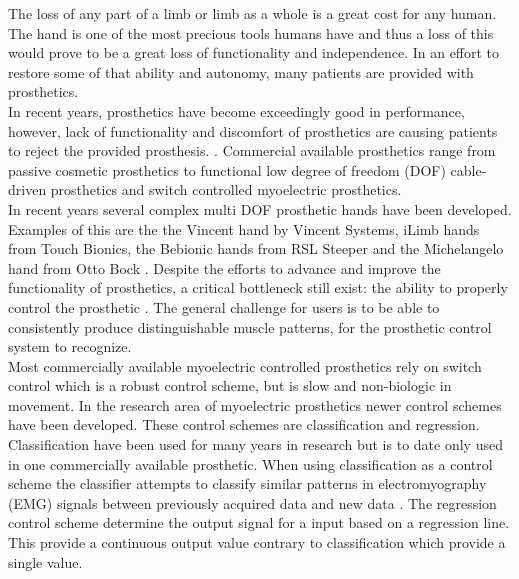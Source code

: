 The loss of any part of a limb or limb as a whole is a great cost for any human. The hand is one of the most precious tools humans have and thus a loss of this would prove to be a great loss of functionality and independence. In an effort to restore some of that ability and autonomy, many patients are provided with prosthetics. \\
In recent years, prosthetics have become exceedingly good in performance, however, lack of functionality and discomfort of prosthetics are causing patients to reject the provided prosthesis. \cite{Reiber2010}. Commercial available prosthetics range from passive cosmetic prosthetics to functional low degree of freedom (DOF) cable-driven prosthetics and switch controlled myoelectric prosthetics. \\
In recent years several complex multi DOF prosthetic hands have been developed. Examples of this are the the Vincent hand by Vincent Systems, iLimb hands from Touch Bionics, the Bebionic hands from RSL Steeper and the Michelangelo hand from Otto Bock \cite{Belter2013}. Despite the efforts to advance and improve the functionality of prosthetics, a critical bottleneck still exist: the ability to properly control the prosthetic \cite{Hwang2017}. The general challenge for users is to be able to consistently produce distinguishable muscle patterns, for the prosthetic control system to recognize. \cite{Powell2014} \\
Most commercially available myoelectric controlled prosthetics rely on switch control which is a robust control scheme, but is slow and non-biologic in movement. In the research area of myoelectric prosthetics newer control schemes have been developed. %
These control schemes are classification and regression. Classification have been used for many years in research but is to date only used in one commercially available prosthetic. When using classification as a control scheme the classifier attempts to classify similar patterns in electromyography (EMG) signals between previously acquired data and new data \cite{Mendez2017}. The regression control scheme determine the output signal for a input based on a regression line. This provide a continuous output value contrary to classification which provide a single value. \cite{Hahne2014} \\
